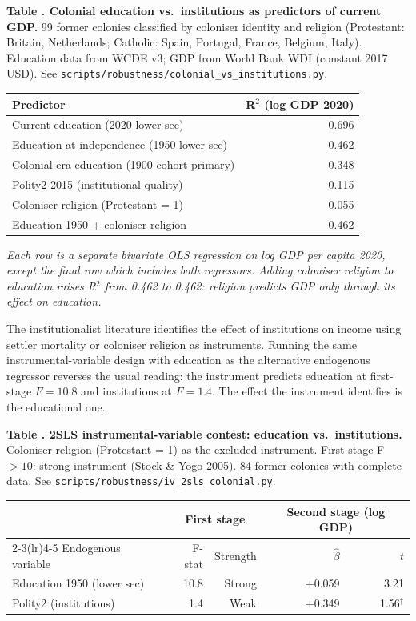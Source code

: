 \documentclass[12pt,letterpaper]{article}
\begin{document}
{\label{tab:a6}\textbf{Table \thetable. Colonial education vs.\ institutions as predictors of
current GDP.} 99 former colonies classified by coloniser identity and
religion (Protestant: Britain, Netherlands; Catholic: Spain, Portugal,
France, Belgium, Italy). Education data from WCDE v3; GDP from World
Bank WDI (constant 2017 USD). See
\texttt{scripts/robustness/colonial\_vs\_institutions.py}.

\begin{longtable}[]{@{}lr@{}}
\toprule
Predictor & R$^2$ (log GDP 2020) \\
\midrule
\endhead
Current education (2020 lower sec) & 0.696 \\
Education at independence (1950 lower sec) & 0.462 \\
Colonial-era education (1900 cohort primary) & 0.348 \\
Polity2 2015 (institutional quality) & 0.115 \\
Coloniser religion (Protestant = 1) & 0.055 \\
Education 1950 + coloniser religion & 0.462 \\
\bottomrule
\end{longtable}

\emph{Each row is a separate bivariate OLS regression on log GDP per
capita 2020, except the final row which includes both regressors.
Adding coloniser religion to education raises R$^2$ from 0.462 to
0.462: religion predicts GDP only through its effect on education.}

\noindent The institutionalist literature identifies the effect of
institutions on income using settler mortality or coloniser religion as
instruments. Running the same instrumental-variable design with
education as the alternative endogenous regressor reverses the usual
reading: the instrument predicts education at first-stage $F=10.8$ and
institutions at $F=1.4$. The effect the instrument identifies is the
educational one.

\label{tab:a7}\textbf{Table \thetable. 2SLS instrumental-variable contest: education vs.\ institutions.}
Coloniser religion (Protestant = 1) as the excluded instrument.
First-stage F $> 10$: strong instrument (Stock \& Yogo 2005).
84 former colonies with complete data. See
\texttt{scripts/robustness/iv\_2sls\_colonial.py}.

{\small
\begin{longtable}[]{@{}lrrrr@{}}
\toprule
 & \multicolumn{2}{c}{First stage} & \multicolumn{2}{c}{Second stage (log GDP)} \\
\cmidrule(lr){2-3}\cmidrule(lr){4-5}
Endogenous variable & F-stat & Strength & $\hat\beta$ & $t$ \\
\midrule
\endhead
Education 1950 (lower sec) & 10.8 & Strong & $+$0.059 & 3.21 \\
Polity2 (institutions) & 1.4 & Weak & $+$0.349 & 1.56$^{\dagger}$ \\
\bottomrule
\end{longtable}
}

}
\end{document}
